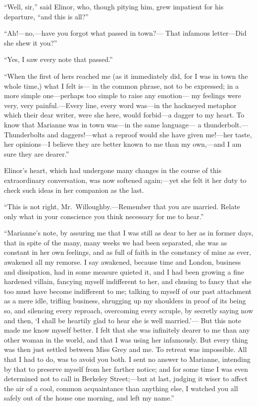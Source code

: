 \documentclass{article}
\begin{document}
``Well, sir,'' said Elinor, who, though pitying him,
grew impatient for his departure, ``and this is all?''

``Ah!---no,---have you forgot what passed in town?---%
That infamous letter---Did she shew it you?''

``Yes, I saw every note that passed.''

``When the first of hers reached me (as it immediately did,
for I was in town the whole time,) what I felt is---%
in the common phrase, not to be expressed; in a more
simple one---perhaps too simple to raise any emotion---%
my feelings were very, very painful.---Every line, every word
was---in the hackneyed metaphor which their dear writer,
were she here, would forbid---a dagger to my heart.
To know that Marianne was in town was---in the same language---%
a thunderbolt.---Thunderbolts and daggers!---what a reproof
would she have given me!---her taste, her opinions---I believe
they are better known to me than my own,---and I am sure
they are dearer.''

Elinor's heart, which had undergone many changes
in the course of this extraordinary conversation,
was now softened again;---yet she felt it her duty to check
such ideas in her companion as the last.

``This is not right, Mr.\ Willoughby.---Remember that
you are married.  Relate only what in your conscience
you think necessary for me to hear.''

``Marianne's note, by assuring me that I was still
as dear to her as in former days, that in spite of the many,
many weeks we had been separated, she was as constant
in her own feelings, and as full of faith in the constancy
of mine as ever, awakened all my remorse.  I say awakened,
because time and London, business and dissipation,
had in some measure quieted it, and I had been growing
a fine hardened villain, fancying myself indifferent to her,
and chusing to fancy that she too must have become
indifferent to me; talking to myself of our past attachment
as a mere idle, trifling business, shrugging up my shoulders
in proof of its being so, and silencing every reproach,
overcoming every scruple, by secretly saying now and then,
`I shall be heartily glad to hear she is well married.'---%
But this note made me know myself better.  I felt that
she was infinitely dearer to me than any other woman
in the world, and that I was using her infamously.
But every thing was then just settled between Miss Grey
and me.  To retreat was impossible.  All that I had to do,
was to avoid you both.  I sent no answer to Marianne,
intending by that to preserve myself from her farther notice;
and for some time I was even determined not to call in
Berkeley Street;---but at last, judging it wiser to affect
the air of a cool, common acquaintance than anything else,
I watched you all safely out of the house one morning,
and left my name.''
\end{document}
